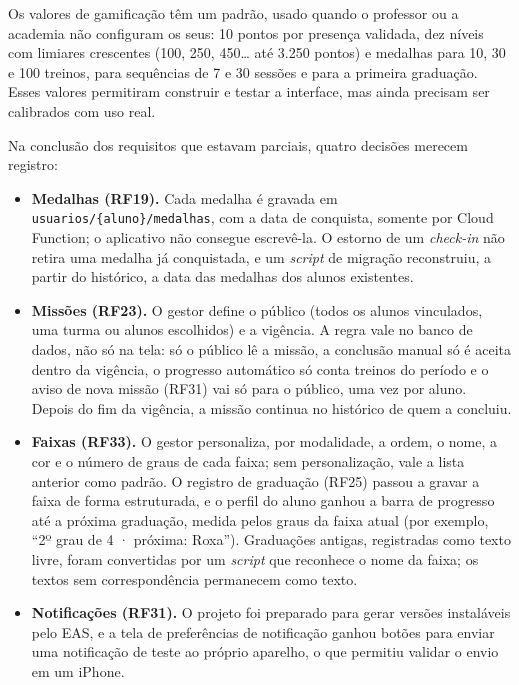 Os valores de gamificação têm um padrão, usado quando o professor ou a
academia não configuram os seus: 10 pontos por presença validada, dez
níveis com limiares crescentes (100, 250, 450\ldots{} até 3.250 pontos) e
medalhas para 10, 30 e 100 treinos, para sequências de 7 e 30 sessões e
para a primeira graduação. Esses valores permitiram construir e testar a
interface, mas ainda precisam ser calibrados com uso real.

Na conclusão dos requisitos que estavam parciais, quatro decisões
merecem registro:

\begin{itemize}
  \item \textbf{Medalhas (RF19).} Cada medalha é gravada em
        \texttt{usuarios/\{aluno\}/medalhas}, com a data de conquista,
        somente por Cloud Function; o aplicativo não consegue escrevê-la.
        O estorno de um \textit{check-in} não retira uma medalha já
        conquistada, e um \textit{script} de migração reconstruiu, a partir
        do histórico, a data das medalhas dos alunos existentes.
  \item \textbf{Missões (RF23).} O gestor define o público (todos os alunos
        vinculados, uma turma ou alunos escolhidos) e a vigência. A regra
        vale no banco de dados, não só na tela: só o público lê a missão,
        a conclusão manual só é aceita dentro da vigência, o progresso
        automático só conta treinos do período e o aviso de nova missão
        (RF31) vai só para o público, uma vez por aluno. Depois do fim da
        vigência, a missão continua no histórico de quem a concluiu.
  \item \textbf{Faixas (RF33).} O gestor personaliza, por modalidade, a
        ordem, o nome, a cor e o número de graus de cada faixa; sem
        personalização, vale a lista anterior como padrão. O registro de
        graduação (RF25) passou a gravar a faixa de forma estruturada, e o
        perfil do aluno ganhou a barra de progresso até a próxima
        graduação, medida pelos graus da faixa atual (por exemplo, ``2º
        grau de 4 · próxima: Roxa''). Graduações antigas, registradas como
        texto livre, foram convertidas por um \textit{script} que reconhece
        o nome da faixa; os textos sem correspondência permanecem como
        texto.
  \item \textbf{Notificações (RF31).} O projeto foi preparado para gerar
        versões instaláveis pelo EAS, e a tela de preferências de
        notificação ganhou botões para enviar uma notificação de teste ao
        próprio aparelho, o que permitiu validar o envio em um iPhone.
\end{itemize}

